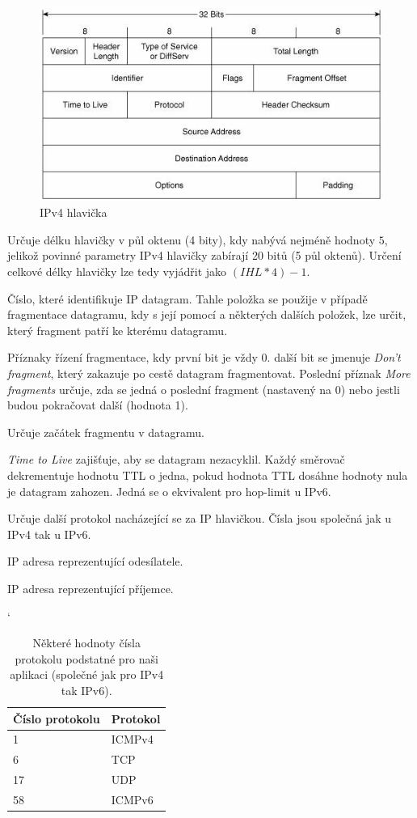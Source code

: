 \documentclass[11pt, a4paper]{article}
\begin{document}
\begin{figure}[h!]
\centering
  \includegraphics[width=0.6\linewidth]{ipv4-header.png}
  \caption[]{IPv4 hlavička\footnotemark}
\end{figure}
\begin{description}[style=multiline,leftmargin=3.5cm]
\item[IHL]
Určuje délku hlavičky v půl oktenu (4 bity), kdy nabývá nejméně hodnoty $5$, jelikož povinné parametry IPv4 hlavičky zabírají 20 bitů (5 půl oktenů). 
Určení celkové délky hlavičky lze tedy vyjádřit jako $(IHL*4)-1$.
\item[Identifikace]
Číslo, které identifikuje IP datagram. 
Tahle položka se použije v případě fragmentace datagramu, kdy s její pomocí a některých dalších položek, lze určit, který fragment patří ke kterému datagramu.
\item[Příznaky] 
Příznaky řízení fragmentace, kdy první bit je vždy 0. další bit se jmenuje \emph{Don’t fragment}, který zakazuje po cestě datagram fragmentovat. 
Poslední příznak \emph{More fragments} určuje, zda se jedná o poslední fragment (nastavený na 0) nebo jestli budou pokračovat další (hodnota 1).
\item[Offset fragmentu] 
Určuje začátek fragmentu v datagramu.
\item[TTL] 
\emph{Time to Live} zajišťuje, aby se datagram nezacyklil. 
Každý směrovač dekrementuje hodnotu TTL o jedna, pokud hodnota TTL dosáhne hodnoty nula je datagram zahozen. 
Jedná se o ekvivalent pro hop-limit u IPv6.
\item[Číslo protokolu] 
Určuje další protokol nacházející se za IP hlavičkou. 
Čísla jsou společná jak u IPv4 tak u IPv6.
\item[Zdrojová IP adresa] 
IP adresa reprezentující odesílatele.
\item[Cílová IP adresa] 
IP adresa reprezentující příjemce.
\end{description}

\begin{table}[H] \catcode`
	\centering
	\begin{tabular}{| l | l |}
		\hline
		Číslo protokolu & Protokol\\ \hline
		1  & ICMPv4 \\ \hline
		6  & TCP \\ \hline
		17 & UDP \\ \hline
		58 & ICMPv6 \\ \hline
	\end{tabular}
	\caption{Některé hodnoty čísla protokolu podstatné pro naši aplikaci (společné jak pro IPv4 tak IPv6).}
\end{table}
\end{document}
